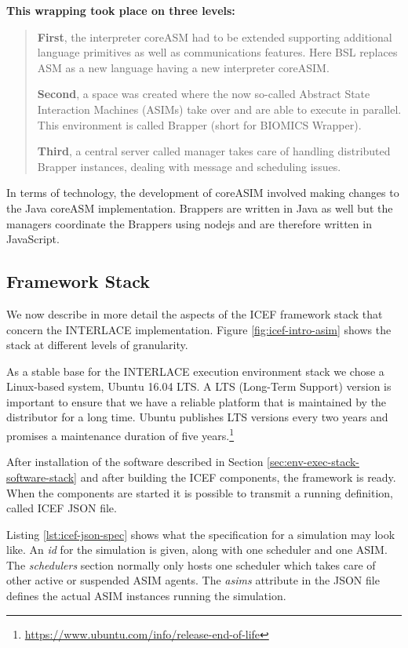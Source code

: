 \textbf{This wrapping took place on three levels:}
\begin{quote}
\small
\textbf{First}, the interpreter coreASM had to be extended supporting additional language primitives as well as communications features. Here BSL replaces ASM as a new language having a new interpreter coreASIM.

\smallskip
\textbf{Second}, a space was created where the now so-called Abstract State Interaction Machines (ASIMs) take over and are able to execute in parallel. This environment is called Brapper (short for BIOMICS Wrapper).

\smallskip
\textbf{Third}, a central server called manager takes care of handling distributed Brapper instances, dealing with message and scheduling issues.
\end{quote}
In terms of technology, the development of coreASIM involved making changes to the Java coreASM implementation. Brappers are written in Java as well but the managers coordinate the Brappers using nodejs and are therefore written in JavaScript.

\subsection{Framework Stack}
We now describe in more detail the aspects of the ICEF framework stack that concern the INTERLACE implementation. Figure \ref{fig:icef-intro-asim} shows the stack at different levels of granularity.

As a stable base for the INTERLACE execution environment stack we chose a Linux-based system, Ubuntu 16.04 LTS. A LTS (Long-Term Support) version is important to ensure that we have a reliable platform that is maintained by the distributor for a long time. Ubuntu publishes LTS versions every two years and promises a maintenance duration of five years.\footnote{\url{https://www.ubuntu.com/info/release-end-of-life}}

After installation of the software described in Section \ref{sec:env-exec-stack-software-stack} and after building the ICEF components, the framework is ready. When the components are started it is possible to transmit a running definition, called ICEF JSON file.

Listing \ref{lst:icef-json-spec} shows what the specification for a simulation may look like. An \textit{id} for the simulation is given, along with one scheduler and one ASIM. The \textit{schedulers} section normally only hosts one scheduler which takes care of other active or suspended ASIM agents. The \textit{asims} attribute in the JSON file defines the actual ASIM instances running the simulation.

